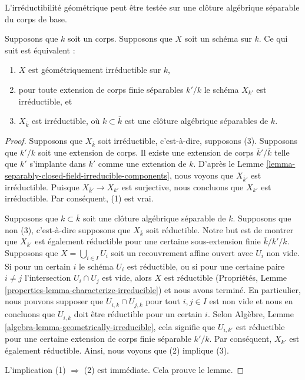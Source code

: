 \begin{lemma}
\label{lemma-characterize-geometrically-irreducible}
\begin{slogan}
L'irréductibilité géométrique peut être testée sur
une clôture algébrique séparable du corps de base.
\end{slogan}
Supposons que $k$ soit un corps. Supposons que $X$
soit un schéma sur $k$. Ce qui suit est équivalent :
\begin{enumerate}
\item $X$ est géométriquement irréductible sur $k$,
\item pour toute extension de corps finie séparables
$k'/k$ le schéma $X_{k'}$ est irréductible, et \item
$X_{\overline{k}}$ est irréductible, où $k \subset
\overline{k}$ est une clôture algébrique séparables de $k$.
\end{enumerate}
\end{lemma}

\begin{proof}
Supposons que $X_{\overline{k}}$ soit irréductible, c'est-à-dire,
supposons (3). Supposons que $k'/k$ soit une extension de corps.
Il existe une extension de corps $\overline{k}'/\overline{k}$
telle que $k'$ s'implante dans $\overline{k}'$ comme une extension
de $k$. D'après le Lemme
\ref{lemma-separably-closed-field-irreducible-components}, nous voyons que
$X_{\overline{k}'}$ est irréductible. Puisque $X_{\overline{k}'} \to X_{k'}$ est
surjective, nous concluons que $X_{k'}$ est irréductible. Par conséquent, (1) est vrai.

\medskip\noindent
Supposons que $k \subset \overline{k}$ soit une clôture
algébrique séparable de $k$. Supposons que non (3),
c'est-à-dire supposons que $X_{\overline{k}}$ soit
réductible. Notre but est de montrer que $X_{k'}$ est
également réductible pour une certaine sous-extension
finie $\overline{k}/k'/k$. Supposons que $X = \bigcup_{i
\in I} U_i$ soit un recouvrement affine ouvert avec $U_i$
non vide. Si pour un certain $i$ le schéma $U_i$ est
réductible, ou si pour une certaine paire $i \not = j$
l'intersection $U_i \cap U_j$ est vide, alors $X$ est
réductible (Propriétés, Lemme
\ref{properties-lemma-characterize-irreducible}) et nous
avons terminé. En particulier, nous pouvons supposer que
$U_{i, \overline{k}} \cap U_{j, \overline{k}}$ pour tout $i, j
\in I$ est non vide et nous en concluons que $U_{i,
\overline{k}}$ doit être réductible pour un certain $i$. Selon
Algèbre, Lemme \ref{algebra-lemma-geometrically-irreducible},
cela signifie que $U_{i, k'}$ est réductible pour une certaine
extension de corps finie séparable $k'/k$. Par conséquent, $X_{k'}$
est également réductible. Ainsi, nous voyons que (2) implique (3).

\medskip\noindent
L'implication (1) $\Rightarrow$ (2)
est immédiate. Cela prouve le lemme.
\end{proof}

